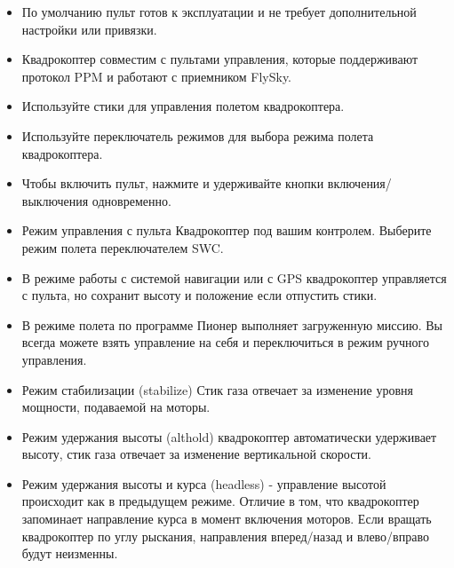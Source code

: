 \documentclass[a4paper,10pt,russian]{sphinxmanual}
\begin{document}
\begin{itemize}
\item {} 
По умолчанию пульт готов к эксплуатации и не требует дополнительной настройки или привязки.

\item {} 
Квадрокоптер совместим с пультами управления, которые поддерживают протокол PPM и работают с приемником FlySky.

\item {} 
Используйте стики для управления полетом квадрокоптера.

\item {} 
Используйте переключатель режимов для выбора режима полета квадрокоптера.

\item {} 
Чтобы включить пульт, нажмите и удерживайте кнопки включения/выключения одновременно.

\end{itemize}


\begin{itemize}
\item {} 
Режим управления с пульта \textendash{} Квадрокоптер под вашим контролем. Выберите режим полета переключателем SWC.

\item {} 
В режиме работы с системой навигации или с GPS \textendash{} квадрокоптер управляется с пульта, но сохранит высоту и положение если отпустить стики.

\item {} 
В режиме полета по программе Пионер выполняет загруженную миссию. Вы всегда можете взять управление на себя и переключиться в режим ручного управления.

\end{itemize}

\begin{itemize}
\item {} 
Режим стабилизации (stabilize)\textendash{} Стик газа отвечает за изменение уровня мощности, подаваемой на моторы.

\item {} 
Режим удержания высоты (althold) \textendash{} квадрокоптер автоматически удерживает высоту, стик газа отвечает за изменение вертикальной скорости.

\item {} 
Режим удержания высоты и курса (headless) - управление высотой происходит как в предыдущем режиме. Отличие в том, что квадрокоптер запоминает направление курса в момент включения моторов. Если вращать квадрокоптер по углу рыскания, направления вперед/назад и влево/вправо будут неизменны.

\end{itemize}
\end{document}
